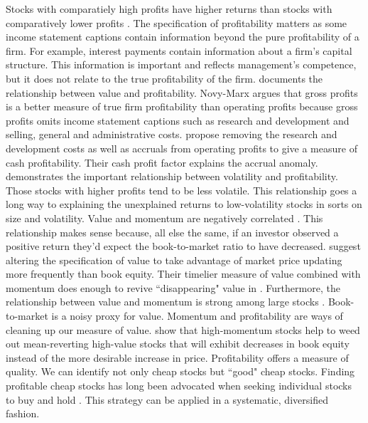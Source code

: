 Stocks with comparatiely high profits have higher returns than stocks with comparatively
lower profits \parencite{fama2006profitability}. The specification of profitability
matters as some income statement captions contain information beyond the pure
profitability of a firm. For example, interest payments contain information about a firm’s
capital structure. This information is important and reflects management’s competence, but
it does not relate to the true profitability of the firm. \textcite{novy2013other}
documents the relationship between value and profitability. Novy-Marx argues that gross
profits is a better measure of true firm profitability than operating profits because
gross profits omits income statement captions such as research and development and
selling, general and administrative costs. \textcite{ball2016accruals} propose removing
the research and development costs as well as accruals from operating profits to give a
measure of cash profitability. Their cash profit factor explains the accrual anomaly.
\textcite{novy2014understanding} demonstrates the important relationship between
volatility and profitability. Those stocks with higher profits tend to be less volatile.
This relationship goes a long way to explaining the unexplained returns to low-volatility
stocks in sorts on size and volatility. Value and momentum are negatively correlated
\parencite{asness1997interaction}. This relationship makes sense because, all else the
same, if an investor observed a positive return they’d expect the book-to-market ratio to
have decreased. \textcite{asness2013devil} suggest altering the specification of value to
take advantage of market price updating more frequently than book equity. Their timelier
measure of value combined with momentum does enough to revive ``disappearing" value in
\textcite{fama2015five}. Furthermore, the relationship between value and momentum is
strong among large stocks \parencite{asness2015fact}. Book-to-market is a noisy proxy for
value. Momentum and profitability are ways of cleaning up our measure of value.
\textcite{kok2017facts} show that high-momentum stocks help to weed out mean-reverting
high-value stocks that will exhibit decreases in book equity instead of the more desirable
increase in price. Profitability offers a measure of quality. We can identify not only
cheap stocks but ``good" cheap stocks. Finding profitable cheap stocks has long been
advocated when seeking individual stocks to buy and hold \parencite{graham1934security}.
This strategy can be applied in a systematic, diversified fashion.
